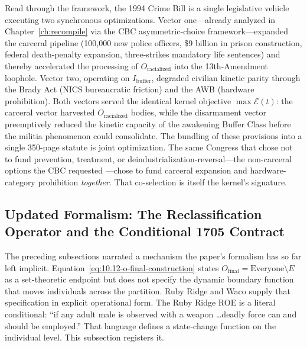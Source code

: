 Read through the framework, the 1994 Crime Bill is a single legislative vehicle executing two synchronous optimizations. Vector one---already analyzed in Chapter~\ref{ch:recompile} via the CBC asymmetric-choice framework---expanded the carceral pipeline (100{,}000 new police officers, \$9 billion in prison construction, federal death-penalty expansion, three-strikes mandatory life sentences) and thereby accelerated the processing of $O_{\text{racialized}}$ into the 13th-Amendment loophole. Vector two, operating on $I_{\text{buffer}}$, degraded civilian kinetic parity through the Brady Act (NICS bureaucratic friction) and the AWB (hardware prohibition). Both vectors served the identical kernel objective $\max\mathcal{E}(t)$: the carceral vector harvested $O_{\text{racialized}}$ bodies, while the disarmament vector preemptively reduced the kinetic capacity of the awakening Buffer Class before the militia phenomenon could consolidate. The bundling of these provisions into a single 350-page statute is joint optimization. The same Congress that chose not to fund prevention, treatment, or deindustrialization-reversal---the non-carceral options the CBC requested \cite{forman}---chose to fund carceral expansion and hardware-category prohibition \textit{together}. That co-selection is itself the kernel's signature.

\subsection{Updated Formalism: The Reclassification Operator and the Conditional 1705 Contract}
\label{subsec:reclassification_operator}

The preceding subsections narrated a mechanism the paper's formalism has so far left implicit. Equation~\eqref{eq:10.12-o-final-construction} states $O_{\text{final}} = \mathrm{Everyone}\setminus E$ as a set-theoretic endpoint but does not specify the dynamic boundary function that moves individuals across the partition. Ruby Ridge and Waco supply that specification in explicit operational form. The Ruby Ridge ROE is a literal conditional: ``if any adult male is observed with a weapon \ldots deadly force can and should be employed.'' That language defines a state-change function on the individual level. This subsection registers it.

